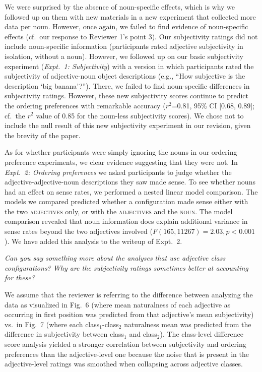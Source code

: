 \documentclass[12pt]{article}
\begin{document}
We were surprised by the absence of noun-specific effects, which is why we followed up on them with new materials in a new experiment that collected more data per noun. However, once again, we failed to find evidence of noun-specific effects (cf.~our response to Reviewer 1's point 3). Our subjectivity ratings did not include noun-specific information (participants rated adjective subjectivity in isolation, without a noun). However, we followed up on our basic subjectivity experiment (\emph{Expt.~1: Subjectivity}) with a version in which participants rated the subjectivity of adjective-noun object descriptions (e.g., ``How subjective is the description `big banana'?''). There, we failed to find noun-specific differences in subjectivity ratings. However, these new subjectivity scores continue to predict the ordering preferences with remarkable accuracy ($r^2${=}0.81, 95\% CI [0.68,  0.89]; cf.~the $r^2$ value of 0.85 for the noun-less subjectivity scores). We chose not to include the null result of this new subjectivity experiment in our revision, given the brevity of the paper.

As for whether participants were simply ignoring the nouns in our ordering preference experiments, we clear evidence suggesting that they were not. In \emph{Expt.~2: Ordering preferences} we asked participants to judge whether the adjective-adjective-noun descriptions they saw made sense. To see whether nouns had an effect on sense rates, we performed a nested linear model comparison. The models we compared predicted whether a configuration made sense either with the two \textsc{adjectives} only, or with the \textsc{adjectives} and the \textsc{noun}. The model comparison revealed that noun information does explain additional variance in sense rates beyond the two adjectives involved ($F(165,11267)=2.03, p<0.001$). We have added this analysis to the writeup of Expt.~2.


\item \emph{Can you say something more about the analyses that use adjective class configurations? Why are the subjectivity ratings sometimes better at accounting for these?}

We assume that the reviewer is referring to the difference between analyzing the data as visualized in Fig.~6 (where mean naturalness of each adjective as occurring in first position was predicted from that adjective's mean subjectivity) vs.~in Fig.~7 (where each class$_1$-class$_2$ naturalness mean was predicted from the difference in subjectivity between class$_1$ and class$_2$). The class-level difference score analysis yielded a stronger correlation between subjectivity and ordering preferences than the adjective-level one because the noise that is present in the adjective-level ratings was smoothed when collapsing across adjective classes. 
\end{document}
